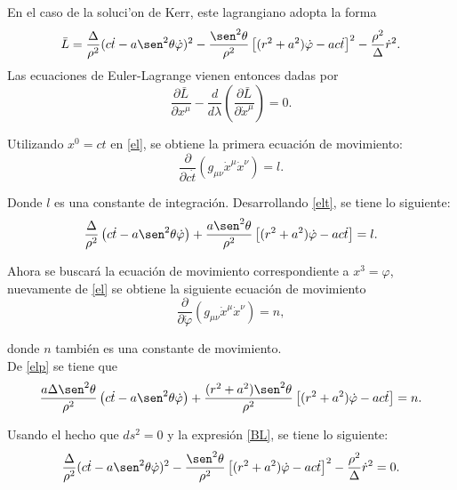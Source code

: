 En el caso de la soluci'on de Kerr, este lagrangiano adopta la forma
\begin{equation}\label{lagrangeano1}
\bar{L}=\frac{\Delta}{\rho^2}(c\dot{t}-a\sen^2\theta \dot{\varphi})^2-\frac{\sen^2\theta}{\rho^2}\left[(r^2+a^2)\dot{\varphi}-ac\dot{t} \right]^2-\frac{\rho^2}{\Delta}\dot{r}^2.
\end{equation}
Las ecuaciones de Euler-Lagrange vienen entonces dadas por
\begin{equation}\label{el}
\frac{\partial \bar{L}}{\partial x^{\mu}}-\frac{d}{d\lambda}\left(\frac{\partial \bar{L}}{\partial \dot{x}^{\mu}} \right)=0.
\end{equation}

Utilizando $x^0=ct$ en \eqref{el}, se obtiene la primera ecuaci\'on de movimiento:
\begin{equation}\label{elt}
\frac{\partial}{\partial c\dot{t}}\left(g_{\mu \nu}\dot{x}^{\mu}\dot{x}^{\nu}\right)=l.
\end{equation}
 
Donde $l$ es una constante de integraci\'on. Desarrollando \eqref{elt}, se tiene lo siguiente:
\begin{equation}\label{11}
\frac{\Delta}{\rho^2}\left(c\dot{t}-a\sen^2 \theta \dot{\varphi}\right)+\frac{a\sen^2 \theta}{\rho^2}\left[(r^2+a^2)\dot{\varphi}-ac\dot{t} \right]=l.
\end{equation} 
 
 Ahora se buscar\'a la ecuaci\'on de movimiento correspondiente a $x^3=\varphi$, nuevamente de \eqref{el} se obtiene la siguiente ecuaci\'on de movimiento
 \begin{equation}\label{elp}
 \frac{\partial}{\partial \dot{\varphi}}\left(g_{\mu \nu}\dot{x}^{\mu}\dot{x}^{\nu}\right)=n,
 \end{equation}
 
donde $n$ tambi\'en es una constante de movimiento.\\

De \eqref{elp} se tiene que
\begin{equation}\label{22}
\frac{a\Delta \sen^2 \theta}{\rho^2}\left(c\dot{t}-a\sen^2 \theta \dot{\varphi}\right)+\frac{(r^2+a^2)\sen^2 \theta}{\rho^2}\left[(r^2+a^2)\dot{\varphi}-ac\dot{t} \right]=n.
\end{equation}
 
Usando el hecho que $ds^2=0$ y la expresi\'on \eqref{BL}, se tiene lo siguiente:
\begin{equation}\label{33}
\frac{\Delta}{\rho^2}(c\dot{t}-a\sen^2\theta \dot{\varphi})^2-\frac{\sen^2\theta}{\rho^2}\left[(r^2+a^2)\dot{\varphi}-ac\dot{t} \right]^2-\frac{\rho^2}{\Delta}\dot{r}^2=0.
\end{equation} 
 
